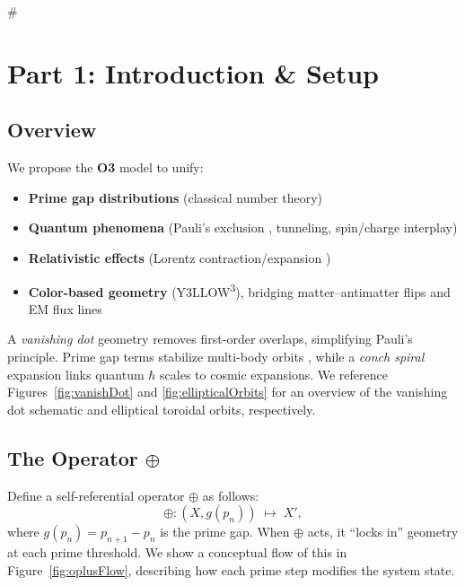 #  \documentclass[11pt]{article}
\begin{document}
\clearpage

\section{Part 1: Introduction \& Setup}
\label{part1}

\subsection{Overview}
We propose the \textbf{O3} model to unify:

\begin{itemize}
    \item \textbf{Prime gap distributions} (classical number theory)
    \item \textbf{Quantum phenomena} (Pauli’s exclusion \cite{Pauli1925}, tunneling, spin/charge interplay)
    \item \textbf{Relativistic effects} (Lorentz contraction/expansion \cite{Lorentz1904})
    \item \textbf{Color-based geometry} (Y3LLOW\textsuperscript{3}), bridging matter--antimatter flips and EM flux lines
\end{itemize}

A \textit{vanishing dot} geometry removes first-order overlaps, simplifying Pauli’s principle. Prime gap terms stabilize multi-body orbits \cite{Poincare1892}, while a \textit{conch spiral} expansion links quantum $\hbar$ scales to cosmic expansions. We reference Figures~\ref{fig:vanishDot} and \ref{fig:ellipticalOrbits} for an overview of the vanishing dot schematic and elliptical toroidal orbits, respectively.

\subsection{The Operator \texorpdfstring{$\oplus$}{\oplus}}
Define a self-referential operator \(\oplus\) as follows:
\[
\oplus: (X, g(p_n)) \;\mapsto\; X',
\]
where \(g(p_n) = p_{n+1} - p_n\) is the prime gap. When \(\oplus\) acts, it “locks in” geometry at each prime threshold. We show a conceptual flow of this in Figure~\ref{fig:oplusFlow}, describing how each prime step modifies the system state.

\clearpage

\end{document}
